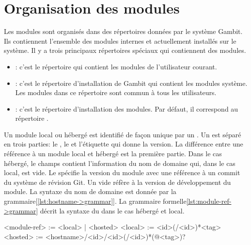 \section{Organisation des modules}

Les modules sont organisés dans des répertoires données par le système Gambit.
Ils contiennent l'ensemble des modules internes et actuellement installés sur
le système. Il y a trois principaux répertoires spéciaux qui contiennent des
modules.

\begin{itemize}
  \item {}: c'est le répertoire qui contient les modules
    de l'utilisateur courant.

  \item {}: c'est le répertoire d'installation de Gambit
    qui contient les modules système. Les modules dans ce répertoire sont
    commun à tous les utilisateurs.

  \item {}: c'est le répertoire d'installation des modules.
    Par défaut, il correspond au répertoire .
\end{itemize}

Un module local ou hébergé est identifié de façon unique par un
.  Un  est séparé en trois parties: le
, le  et l'étiquette qui donne la version.  La
différence entre une référence à un module local et hébergé est la première
partie. Dans le cas hébergé, le champs  contient
l'information du nom de domaine qui, dans le cas local, est vide.
Le  spécifie la version du module avec une référence à
un commit du système de révision Git. Un  vide réfère
à la version de développement du module.  La syntaxe du
nom de domaine est donnée par la grammaire[\ref{lst:hostname->grammar}].  La
grammaire formelle\ref{lst:module-ref->grammar} décrit la syntaxe du
 dans le cas hébergé et local.

\begin{center}
  \begin{mplisting}{0.8}
<module-ref> := <local> | <hosted>
<local>      := <id>(/<id>)*<tag>
<hosted>     := <hostname>/<id>/<id>(/<id>)*(@<tag>)?
\end{mplisting}
  \label{lst:module-ref->grammar}
\end{center}

